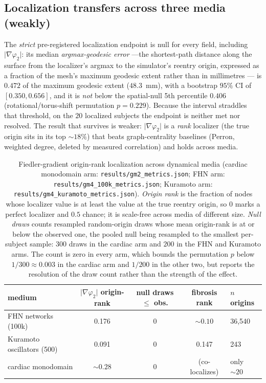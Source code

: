 \documentclass[11pt]{article}
\theoremstyle{definition}
\newcommand{\phii}{\varphi}
\newcommand{\code}[1]{\texttt{#1}}
\begin{document}
\subsection{Localization transfers across three media (weakly)}
\label{sec:localize}
The \emph{strict} pre-registered localization endpoint is null for every field,
including $\lvert\nabla\phii_2\rvert$: its median \emph{argmax-geodesic error}
---the shortest-path distance along the surface from the localizer's argmax to
the simulator's reentry origin, expressed as a fraction of the mesh's maximum
geodesic extent rather than in millimetres --- is
$0.472$ of the maximum geodesic extent ($48.3$~mm), with a bootstrap $95\%$ CI
of $[0.350,0.656]$, and it is \emph{not} below the spatial-null 5th percentile
$0.406$ (rotational/torus-shift permutation $p=0.229$). Because the interval
straddles that threshold, on the $20$ localized subjects the endpoint is neither
met nor resolved. The result that survives is weaker:
$\lvert\nabla\phii_2\rvert$ is a \emph{rank} localizer (the true origin sits in
its top $\sim\!18\%$) that beats graph-centrality baselines (Perron, weighted
degree, deleted by measured correlation) and holds across media.

\begin{table}[H]
\centering
\caption{Fiedler-gradient origin-rank localization across dynamical media
(cardiac monodomain arm: \code{results/\allowbreak gm2\allowbreak\_metrics.json};
FHN arm: \code{results/\allowbreak gm4\allowbreak\_100k\allowbreak\_metrics.json};
Kuramoto arm: \code{results/\allowbreak gm4\allowbreak\_kuramoto\allowbreak\_metrics.json}).
\emph{Origin rank} is
the fraction of nodes whose localizer value is at least the value at the true
reentry origin, so $0$ marks a perfect localizer and $0.5$ chance; it is
scale-free across media of different size. \emph{Null draws} counts resampled
random-origin draws whose mean origin-rank is at or below the observed one, the
pooled null being resampled to the smallest per-subject sample: $300$ draws in
the cardiac arm and $200$ in the FHN and Kuramoto arms. The count is zero in
every arm, which bounds the permutation $p$ below $1/300\approx0.003$ in the
cardiac arm and $1/200$ in the other two, but reports the resolution of the draw
count rather than the strength of the effect.}
\label{tab:localize}
\small
\begin{tabularx}{\linewidth}{@{}l c c c X@{}}
\toprule
medium & $\lvert\nabla\phii_2\rvert$ origin-rank & null draws $\le$ obs. &
fibrosis rank & $n$ origins \\
\midrule
FHN networks (100k)      & 0.176 & $0$ & $\sim\!0.10$ & 36{,}540 \\
Kuramoto oscillators (500) & 0.091 & $0$ & 0.147 & 243 \\
cardiac monodomain       & $\sim\!0.28$ & $0$ & (co-localizes) & only $\sim\!20$ \\
\bottomrule
\end{tabularx}
\end{table}
\end{document}
